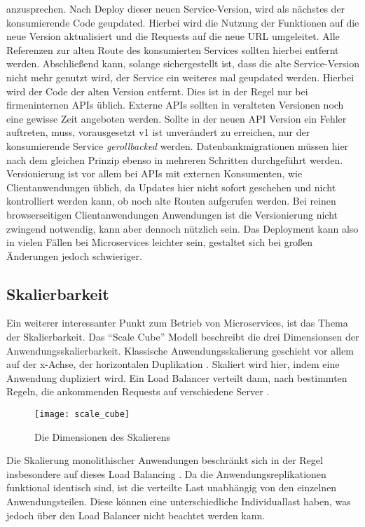 \noindent anzusprechen. Nach Deploy dieser neuen Service-Version, wird als nächstes der konsumierende Code geupdated. Hierbei wird die Nutzung der Funktionen auf die neue Version aktualisiert und die Requests auf die neue URL umgeleitet. Alle Referenzen zur alten Route des konsumierten Services sollten hierbei entfernt werden. Abschließend kann, solange sichergestellt ist, dass die alte Service-Version nicht mehr genutzt wird, der Service ein weiteres mal geupdated werden. Hierbei wird der Code der alten Version entfernt. Dies ist in der Regel nur bei firmeninternen APIs üblich. Externe APIs sollten in veralteten Versionen noch eine gewisse Zeit angeboten werden. Sollte in der neuen API Version ein Fehler auftreten, muss, vorausgesetzt v1 ist unverändert zu erreichen, nur der konsumierende Service \textit{gerollbacked} werden.
Datenbankmigrationen müssen hier nach dem gleichen Prinzip ebenso in mehreren Schritten durchgeführt werden.
Versionierung ist vor allem bei APIs mit externen Konsumenten, wie Clientanwendungen üblich, da Updates hier nicht sofort geschehen und nicht kontrolliert werden kann, ob noch alte Routen aufgerufen werden. Bei reinen browserseitigen Clientanwendungen Anwendungen ist die Versionierung nicht zwingend notwendig, kann aber dennoch nützlich sein.
Das Deployment kann also in vielen Fällen bei Microservices leichter sein, gestaltet sich bei großen Änderungen jedoch schwieriger.

\subsection{Skalierbarkeit}
Ein weiterer interessanter Punkt zum Betrieb von Microservices, ist das Thema der Skalierbarkeit.
Das \enquote{Scale Cube} \cite[][]{abbott2009art} Modell beschreibt die drei Dimensionsen der Anwendungsskalierbarkeit. Klassische Anwendungsskalierung geschieht vor allem auf der x-Achse, der horizontalen Duplikation \cite[][]{abbott2009art}. Skaliert wird hier, indem eine Anwendung dupliziert wird. Ein Load Balancer verteilt dann, nach bestimmten Regeln, die ankommenden Requests auf verschiedene Server \cite[vgl.][]{loadbalancing}.

\begin{figure}[!ht]
    \caption{Die Dimensionen des Skalierens \cite{abbott2009art}}
    \label{fig:scalecube}
    \texttt{[image: scale\_cube]}
\end{figure}

Die Skalierung monolithischer Anwendungen beschränkt sich in der Regel insbesondere auf dieses Load Balancing \cite[vgl.][]{infaktuell}.
Da die Anwendungsreplikationen funktional identisch sind, ist die verteilte Last unabhängig von den einzelnen Anwendungsteilen. Diese können eine unterschiedliche Individuallast haben, was jedoch über den Load Balancer nicht beachtet werden kann.

